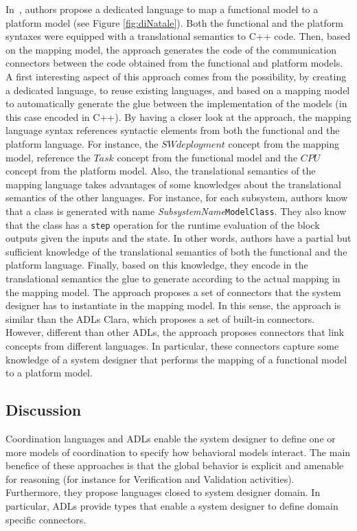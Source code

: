 In~\cite{dinatale}, authors propose a dedicated language to map a functional model to a platform model (see Figure \ref{fig:diNatale}). Both the functional and the platform syntaxes were equipped with a translational semantics to C++ code. Then, based on the mapping model, the approach generates the code of the communication connectors between the code obtained from the functional and platform models. A first interesting aspect of this approach comes from the possibility, by creating a dedicated language, to reuse existing languages, and based on a mapping model to automatically generate the glue between the implementation of the models (in this case encoded in C++). By having a closer look at the approach, the mapping language syntax references syntactic elements from both the functional and the platform language. For instance, the $SWdeployment$ concept from the mapping model, reference the $Task$ concept from the functional model and the $CPU$ concept from the platform model. Also, the translational semantics of the mapping language takes advantages of some knowledges about the translational semantics of the other languages. For instance, for each subsystem, authors know that a class is generated with name \emph{SubsystemName}\texttt{ModelClass}. They also know that the class has a \texttt{step} operation for the runtime evaluation of the block outputs given the inputs and the state. In other words, authors have a partial but sufficient knowledge of the translational semantics of both the functional and the platform language. Finally, based on this knowledge, they encode in the translational semantics the glue to generate according to the actual mapping in the mapping model. The approach proposes a set of connectors that the system designer has to instantiate in the mapping model. In this sense, the approach is similar than the ADLs Clara, which proposes a set of built-in connectors. However, different than other ADLs, the approach proposes connectors that link concepts from different languages. In particular, these connectors capture some knowledge of a system designer that performs the mapping of a functional model to a platform model.

\subsection{Discussion}
Coordination languages and ADLs enable the system designer to define one or more models of coordination to specify how behavioral models interact. The main benefice of these approaches is that the global behavior is explicit and amenable for reasoning (for instance for Verification and Validation activities). Furthermore, they propose languages closed to system designer domain. In particular, ADLs provide types that enable a system designer to define domain specific connectors.  

